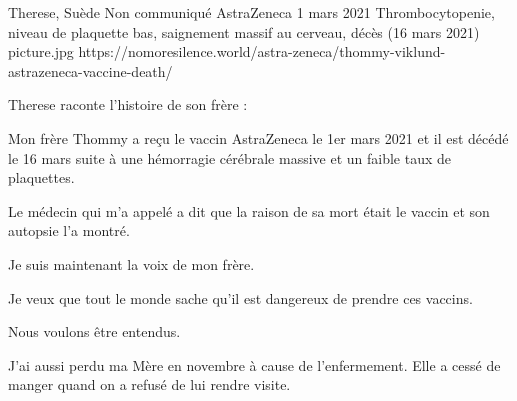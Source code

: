{Therese, Suède}
{Non communiqué}
{AstraZeneca}
{1 mars 2021}
{Thrombocytopenie, niveau de plaquette bas, saignement massif au cerveau, décès (16 mars 2021)}
{picture.jpg}
{https://nomoresilence.world/astra-zeneca/thommy-viklund-astrazeneca-vaccine-death/}
{

Therese raconte l'histoire de son frère :

Mon frère Thommy a reçu le vaccin AstraZeneca le 1er mars 2021 et il est décédé
le 16 mars suite à une hémorragie cérébrale massive et un faible taux de
plaquettes.

Le médecin qui m'a appelé a dit que la raison de sa mort était le vaccin et son
autopsie l'a montré.

Je suis maintenant la voix de mon frère.

Je veux que tout le monde sache qu'il est dangereux de prendre ces vaccins.

Nous voulons être entendus.

J'ai aussi perdu ma Mère en novembre à cause de l'enfermement. Elle a cessé de
manger quand on a refusé de lui rendre visite.

}
